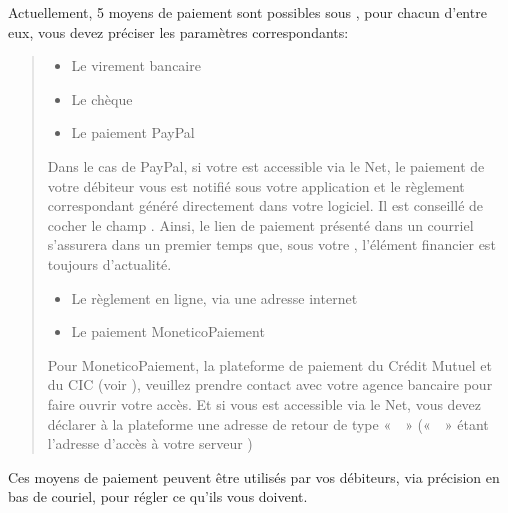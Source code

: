 \documentclass[a4paper,10pt,oneside,french]{sphinxmanual}
\begin{document}
\sphinxAtStartPar
Actuellement, 5 moyens de paiement sont possibles sous , pour chacun d’entre eux, vous devez préciser les paramètres correspondants:
\begin{quote}
\begin{itemize}
\item {} 
\sphinxAtStartPar
Le virement bancaire

\item {} 
\sphinxAtStartPar
Le chèque

\item {} 
\sphinxAtStartPar
Le paiement PayPal

\end{itemize}

\sphinxAtStartPar
Dans le cas de PayPal, si votre  est accessible via le Net, le paiement de votre débiteur vous est notifié sous votre application et le règlement correspondant généré directement dans votre logiciel.
Il est conseillé de cocher le champ . Ainsi, le lien de paiement présenté dans un courriel s’assurera dans un premier temps que, sous votre , l’élément financier est toujours d’actualité.
\begin{itemize}
\item {} 
\sphinxAtStartPar
Le règlement en ligne, via une adresse internet

\item {} 
\sphinxAtStartPar
Le paiement MoneticoPaiement

\end{itemize}

\sphinxAtStartPar
Pour MoneticoPaiement, la plateforme de paiement du Crédit Mutuel et du CIC (voir ), veuillez prendre contact avec votre agence bancaire pour faire ouvrir votre accès.
Et si vous  est accessible via le Net, vous devez déclarer à la plateforme une adresse de retour de type «  » («  » étant l’adresse d’accès à votre serveur )
\end{quote}

\sphinxAtStartPar
Ces moyens de paiement peuvent être utilisés par vos débiteurs, via précision en bas de couriel, pour régler ce qu’ils vous doivent.
\end{document}
